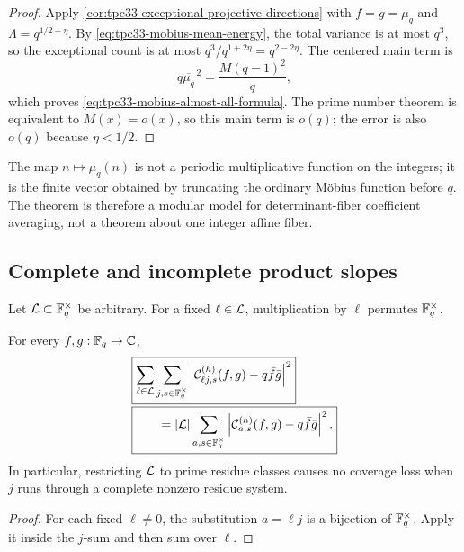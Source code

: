 \begin{proof}
Apply \cref{cor:tpc33-exceptional-projective-directions} with
\(f=g=\mu_q\) and \(\Lambda=q^{1/2+\eta}\).  By
\eqref{eq:tpc33-mobius-mean-energy}, the total variance is at most \(q^3\),
so the exceptional count is at most
\(q^3/q^{1+2\eta}=q^{2-2\eta}\).  The centered main term is
\[
 q\overline{\mu_q}^{\,2}=\frac{M(q-1)^2}{q},
\]
which proves \eqref{eq:tpc33-mobius-almost-all-formula}.  The prime number
theorem is equivalent to \(M(x)=o(x)\), so this main term is \(o(q)\); the
error is also \(o(q)\) because \(\eta<1/2\).
\end{proof}

\begin{remark}
The map \(n\mapsto\mu_q(n)\) is not a periodic multiplicative function on
the integers; it is the finite vector obtained by truncating the ordinary
M\"obius function before \(q\).  The theorem is therefore a modular model
for determinant-fiber coefficient averaging, not a theorem about one
integer affine fiber.
\end{remark}

\subsection{Complete and incomplete product slopes}

Let \(\mathcal L\subset\mathbb F_q^\times\) be arbitrary.  For a fixed
\(\ell\in\mathcal L\), multiplication by \(\ell\) permutes
\(\mathbb F_q^\times\).

\begin{proposition}
\label{prop:tpc33-product-slope-lift}
For every \(f,g:\mathbb F_q\to\mathbb C\),
\begin{align}
 &\boxed{
 \sum_{\ell\in\mathcal L}
 \sum_{j,s\in\mathbb F_q^\times}
 \left|
  \mathcal C_{\ell j,s}^{(h)}(f,g)-q\bar f\bar g
 \right|^2}
 \notag\\[-0.2em]
 &\boxed{\qquad
 =|\mathcal L|
 \sum_{a,s\in\mathbb F_q^\times}
 \left|
  \mathcal C_{a,s}^{(h)}(f,g)-q\bar f\bar g
 \right|^2.}
 \label{eq:tpc33-product-slope-lift}
\end{align}
In particular, restricting \(\mathcal L\) to prime residue classes causes no
coverage loss when \(j\) runs through a complete nonzero residue system.
\end{proposition}

\begin{proof}
For each fixed \(\ell\ne0\), the substitution \(a=\ell j\) is a
bijection of \(\mathbb F_q^\times\).  Apply it inside the \(j\)-sum and then sum
over \(\ell\).
\end{proof}

